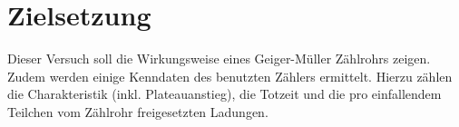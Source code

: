 \section{Zielsetzung}
\label{sec:Zielsetzung}

Dieser Versuch soll die Wirkungsweise eines Geiger-Müller Zählrohrs zeigen.
Zudem werden einige Kenndaten des benutzten Zählers ermittelt.
Hierzu zählen die Charakteristik (inkl. Plateauanstieg), die Totzeit und die pro einfallendem Teilchen vom Zählrohr freigesetzten Ladungen.